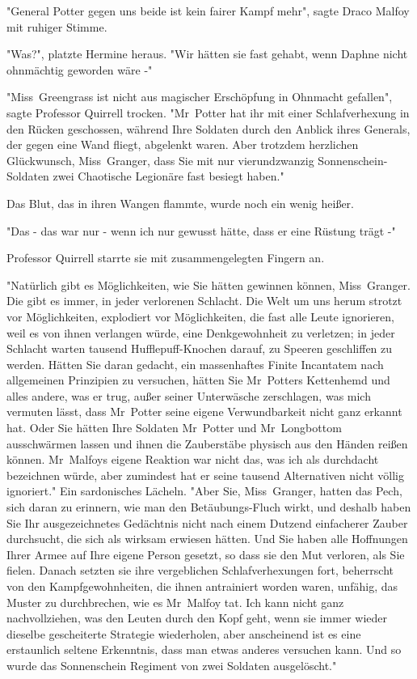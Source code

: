 {"General Potter gegen uns beide ist kein fairer Kampf mehr", sagte Draco Malfoy mit ruhiger Stimme.

"Was?", platzte Hermine heraus. "Wir hätten sie fast gehabt, wenn Daphne nicht ohnmächtig geworden wäre -"

"Miss~Greengrass ist nicht aus magischer Erschöpfung in Ohnmacht gefallen", sagte Professor Quirrell trocken. "Mr~Potter hat ihr mit einer Schlafverhexung in den Rücken geschossen, während Ihre Soldaten durch den Anblick ihres Generals, der gegen eine Wand fliegt, abgelenkt waren. Aber trotzdem herzlichen Glückwunsch, Miss~Granger, dass Sie mit nur vierundzwanzig Sonnenschein-Soldaten zwei Chaotische Legionäre fast besiegt haben."

Das Blut, das in ihren Wangen flammte, wurde noch ein wenig heißer.

"Das - das war nur - wenn ich nur gewusst hätte, dass er eine Rüstung trägt -"

Professor Quirrell starrte sie mit zusammengelegten Fingern an.

"Natürlich gibt es Möglichkeiten, wie Sie hätten gewinnen können, Miss~Granger. Die gibt es immer, in jeder verlorenen Schlacht. Die Welt um uns herum strotzt vor Möglichkeiten, explodiert vor Möglichkeiten, die fast alle Leute ignorieren, weil es von ihnen verlangen würde, eine Denkgewohnheit zu verletzen; in jeder Schlacht warten tausend Hufflepuff-Knochen darauf, zu Speeren geschliffen zu werden. Hätten Sie daran gedacht, ein massenhaftes Finite Incantatem nach allgemeinen Prinzipien zu versuchen, hätten Sie Mr~Potters Kettenhemd und alles andere, was er trug, außer seiner Unterwäsche zerschlagen, was mich vermuten lässt, dass Mr~Potter seine eigene Verwundbarkeit nicht ganz erkannt hat. Oder Sie hätten Ihre Soldaten Mr~Potter und Mr~Longbottom ausschwärmen lassen und ihnen die Zauberstäbe physisch aus den Händen reißen können. Mr~Malfoys eigene Reaktion war nicht das, was ich als durchdacht bezeichnen würde, aber zumindest hat er seine tausend Alternativen nicht völlig ignoriert." Ein sardonisches Lächeln. "Aber Sie, Miss~Granger, hatten das Pech, sich daran zu erinnern, wie man den Betäubungs-Fluch wirkt, und deshalb haben Sie Ihr ausgezeichnetes Gedächtnis nicht nach einem Dutzend einfacherer Zauber durchsucht, die sich als wirksam erwiesen hätten. Und Sie haben alle Hoffnungen Ihrer Armee auf Ihre eigene Person gesetzt, so dass sie den Mut verloren, als Sie fielen. Danach setzten sie ihre vergeblichen Schlafverhexungen fort, beherrscht von den Kampfgewohnheiten, die ihnen antrainiert worden waren, unfähig, das Muster zu durchbrechen, wie es Mr~Malfoy tat. Ich kann nicht ganz nachvollziehen, was den Leuten durch den Kopf geht, wenn sie immer wieder dieselbe gescheiterte Strategie wiederholen, aber anscheinend ist es eine erstaunlich seltene Erkenntnis, dass man etwas anderes versuchen kann. Und so wurde das Sonnenschein Regiment von zwei Soldaten ausgelöscht."

}
